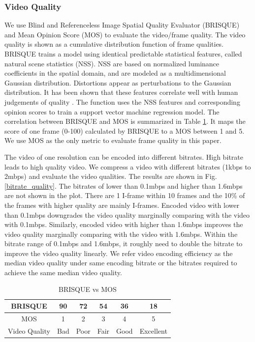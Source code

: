 \subsubsection{Video Quality}
\label{sec_quality}


We use Blind and Referenceless Image Spatial Quality Evaluator (BRISQUE) 
\cite{mittal2012no} and Mean Opinion Score (MOS) \cite{bauman2017towards}
to evaluate the video/frame quality. 
The video quality is shown as a cumulative distribution function of frame qualities.  
BRISQUE trains a model using identical predictable statistical features, 
called natural scene statistics (NSS). 
NSS are based on normalized luminance coefficients in the spatial domain, 
and are modeled as a multidimensional Gaussian distribution. 
Distortions appear as perturbations to the Gaussian distribution.
It has been shown that these features correlate well with 
human judgements of quality \cite{mittal2012no, bauman2017towards}. 
The function uses the NSS features and corresponding opinion scores to train
a support vector machine regression model. 
The correlation between BRISQUE and MOS is summarized in Table \ref{brisque}.
It maps the score of one frame (0-100) calculated by BRISQUE to 
a MOS between 1 and 5. 
We use MOS as the only metric to evaluate frame quality in this paper. 

The video of one resolution can be encoded into different bitrates. 
High bitrate leads to high quality video. 
We compress a video with different bitrates (1kbps to 2mbps) and evaluate the video qualities.
The results are shown in Fig. \ref{bitrate_quality}. 
The bitrates of lower than 0.1mbps and higher than 1.6mbps are not shown 
in the plot. 
There are 1 I-frame within 10 frames 
and the 10\% of the frames with higher quality are mainly I-frames.  
Encoded video with lower than 0.1mbps downgrades the video quality marginally
comparing with the video with 0.1mbps. 
Similarly, encoded video with higher than 1.6mbps improves the
video quality marginally comparing with the video with 1.6mbps. 
Within the bitrate range of 0.1mbps and 1.6mbps, 
it roughly need to double the bitrate to improve the video quality linearly. 
We refer video encoding efficiency as the median video quality under
same encoding bitrate or the bitrates required to achieve the same
median video quality. 



\begin{table}[t]
  \centering
  \caption[psnr]{BRISQUE vs MOS}
  \vspace{-0.0cm}
  \label{brisque}
  \begin{tabular}{|c|c|c|c|c|c|}
  \hline
BRISQUE & 90 & 72 & 54 & 36 & 18
\\  \hline
MOS & 1 & 2 & 3 & 4 & 5
\\  \hline
Video Quality & Bad & Poor & Fair & Good & Excellent 
\\  \hline      
  \end{tabular}
  \vspace{-0.0cm}
\end{table}


